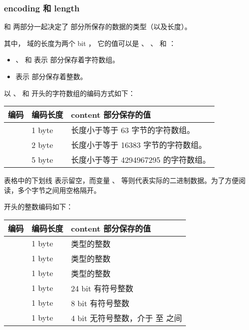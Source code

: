 \documentclass[a4paper,11pt,english]{sphinxmanual}
\begin{document}
\subsubsection{encoding 和 length}
\label{compress-datastruct/ziplist:encoding-length}
 和  两部分一起决定了  部分所保存的数据的类型（以及长度）。

其中，  域的长度为两个 bit ，
它的值可以是  、  、  和  ：
\begin{itemize}
\item {} 
 、  和  表示  部分保存着字符数组。

\item {} 
 表示  部分保存着整数。

\end{itemize}

以  、  和  开头的字符数组的编码方式如下：

\begin{tabulary}{\linewidth}{|p{8.5cm}|L|p{4.2cm}|}
\hline
\textbf{
编码
} & \textbf{
编码长度
} & \textbf{
content 部分保存的值
}\\\hline

 & 
1 byte
 & 
长度小于等于 63 字节的字符数组。
\\\hline

 & 
2 byte
 & 
长度小于等于 16383 字节的字符数组。
\\\hline

 & 
5 byte
 & 
长度小于等于 4294967295 的字符数组。
\\\hline
\end{tabulary}


表格中的下划线 \code{\_} 表示留空，而变量  、  等则代表实际的二进制数据。为了方便阅读，多个字节之间用空格隔开。

 开头的整数编码如下：

\begin{tabulary}{\linewidth}{|L|L|L|}
\hline
\textbf{
编码
} & \textbf{
编码长度
} & \textbf{
content 部分保存的值
}\\\hline

 & 
1 byte
 & 
 类型的整数
\\\hline

 & 
1 byte
 & 
 类型的整数
\\\hline

 & 
1 byte
 & 
 类型的整数
\\\hline

 & 
1 byte
 & 
24 bit 有符号整数
\\\hline

 & 
1 byte
 & 
8 bit 有符号整数
\\\hline

 & 
1 byte
 & 
4 bit 无符号整数，介于  至  之间
\\\hline
\end{tabulary}
\end{document}
